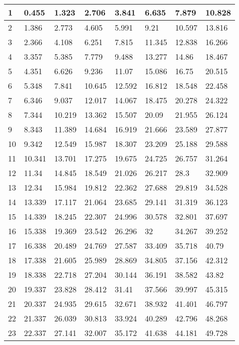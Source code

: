 \documentclass[letterpaper,10pt,english]{sphinxmanual}
\begin{document}
\begin{savenotes}
\begin{longtable}[c]{|l|l|l|l|l|l|l|l|}
1
&
0.455
&
1.323
&
2.706
&
3.841
&
6.635
&
7.879
&
10.828
\\
\hline
2
&
1.386
&
2.773
&
4.605
&
5.991
&
9.21
&
10.597
&
13.816
\\
\hline
3
&
2.366
&
4.108
&
6.251
&
7.815
&
11.345
&
12.838
&
16.266
\\
\hline
4
&
3.357
&
5.385
&
7.779
&
9.488
&
13.277
&
14.86
&
18.467
\\
\hline
5
&
4.351
&
6.626
&
9.236
&
11.07
&
15.086
&
16.75
&
20.515
\\
\hline
6
&
5.348
&
7.841
&
10.645
&
12.592
&
16.812
&
18.548
&
22.458
\\
\hline
7
&
6.346
&
9.037
&
12.017
&
14.067
&
18.475
&
20.278
&
24.322
\\
\hline
8
&
7.344
&
10.219
&
13.362
&
15.507
&
20.09
&
21.955
&
26.124
\\
\hline
9
&
8.343
&
11.389
&
14.684
&
16.919
&
21.666
&
23.589
&
27.877
\\
\hline
10
&
9.342
&
12.549
&
15.987
&
18.307
&
23.209
&
25.188
&
29.588
\\
\hline
11
&
10.341
&
13.701
&
17.275
&
19.675
&
24.725
&
26.757
&
31.264
\\
\hline
12
&
11.34
&
14.845
&
18.549
&
21.026
&
26.217
&
28.3
&
32.909
\\
\hline
13
&
12.34
&
15.984
&
19.812
&
22.362
&
27.688
&
29.819
&
34.528
\\
\hline
14
&
13.339
&
17.117
&
21.064
&
23.685
&
29.141
&
31.319
&
36.123
\\
\hline
15
&
14.339
&
18.245
&
22.307
&
24.996
&
30.578
&
32.801
&
37.697
\\
\hline
16
&
15.338
&
19.369
&
23.542
&
26.296
&
32
&
34.267
&
39.252
\\
\hline
17
&
16.338
&
20.489
&
24.769
&
27.587
&
33.409
&
35.718
&
40.79
\\
\hline
18
&
17.338
&
21.605
&
25.989
&
28.869
&
34.805
&
37.156
&
42.312
\\
\hline
19
&
18.338
&
22.718
&
27.204
&
30.144
&
36.191
&
38.582
&
43.82
\\
\hline
20
&
19.337
&
23.828
&
28.412
&
31.41
&
37.566
&
39.997
&
45.315
\\
\hline
21
&
20.337
&
24.935
&
29.615
&
32.671
&
38.932
&
41.401
&
46.797
\\
\hline
22
&
21.337
&
26.039
&
30.813
&
33.924
&
40.289
&
42.796
&
48.268
\\
\hline
23
&
22.337
&
27.141
&
32.007
&
35.172
&
41.638
&
44.181
&
49.728
\\

\end{longtable}
\end{savenotes}
\end{document}
